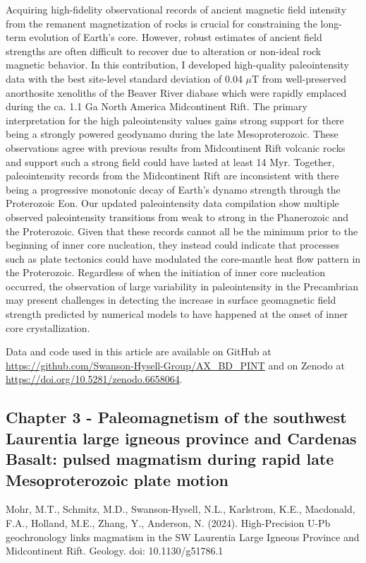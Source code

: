 \documentclass{ucbthesis}
\begin{document}
\begin{frontmatter}
Acquiring high-fidelity observational records of ancient magnetic field intensity from the remanent magnetization of rocks is crucial for constraining the long-term evolution of Earth’s core. However, robust estimates of ancient field strengths are often difficult to recover due to alteration or non-ideal rock magnetic behavior. In this contribution, I developed high-quality paleointensity data with the best site-level standard deviation of 0.04 $\mu$T from well-preserved anorthosite xenoliths of the Beaver River diabase which were rapidly emplaced during the ca. 1.1 Ga North America Midcontinent Rift. The primary interpretation for the high paleointensity values gains strong support for there being a strongly powered geodynamo during the late Mesoproterozoic. These observations agree with previous results from Midcontinent Rift volcanic rocks and support such a strong field could have lasted at least 14 Myr. Together, paleointensity records from the Midcontinent Rift are inconsistent with there being a progressive monotonic decay of Earth’s dynamo strength through the Proterozoic Eon.
Our updated paleointensity data compilation show multiple observed paleointensity transitions from weak to strong in the Phanerozoic and the Proterozoic. Given that these records cannot all be the minimum prior to the beginning of inner core nucleation, they instead could indicate that processes such as plate tectonics could have modulated the core-mantle heat flow pattern in the Proterozoic. Regardless of when the initiation of inner core nucleation occurred, the observation of large variability in paleointensity in the Precambrian may present challenges in detecting the increase in surface geomagnetic field strength predicted by numerical models to have happened at the onset of inner core crystallization.

Data and code used in this article are available on GitHub at \url{https://github.com/Swanson-Hysell-Group/AX_BD_PINT} and on Zenodo at \url{https://doi.org/10.5281/zenodo.6658064}.


\subsection{Chapter 3 - Paleomagnetism of the southwest Laurentia large igneous province and Cardenas Basalt: pulsed magmatism during rapid late Mesoproterozoic plate motion}

Mohr, M.T., Schmitz, M.D., Swanson-Hysell, N.L., Karlstrom, K.E., Macdonald, F.A., Holland, M.E., Zhang, Y., Anderson, N. (2024). High-Precision U-Pb geochronology links magmatism in the SW Laurentia Large Igneous Province and Midcontinent Rift. Geology. doi: 10.1130/g51786.1
\\


\end{frontmatter}
\end{document}
